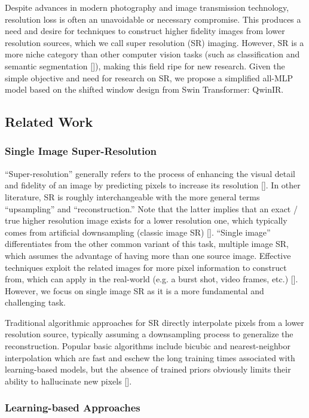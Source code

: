 \documentclass{article}
\begin{document}
Despite advances in modern photography and image transmission technology, resolution loss is often an unavoidable or necessary compromise. This produces a need and desire for techniques to construct higher fidelity images from lower resolution sources, which we call super resolution (SR) imaging. However, SR is a more niche category than other computer vision tasks (such as classification and semantic segmentation []), making this field ripe for new research. Given the simple objective and need for research on SR, we propose a simplified all-MLP model based on the shifted window design from Swin Transformer: QwinIR.

\subsection{Related Work}

\subsubsection{Single Image Super-Resolution}

“Super-resolution” generally refers to the process of enhancing the visual detail and fidelity of an image by predicting pixels to increase its resolution []. In other literature, SR is roughly interchangeable with the more general terms “upsampling” and “reconstruction.” Note that the latter implies that an exact / true higher resolution image exists for a lower resolution one, which typically comes from artificial downsampling (classic image SR) []. “Single image”  differentiates from the other common variant of this task, multiple image SR, which assumes the advantage of having more than one source image. Effective techniques exploit the related images for more pixel information to construct from, which can apply in the real-world (e.g. a burst shot, video frames, etc.) []. However, we focus on single image SR as it is a more fundamental and challenging task.

Traditional algorithmic approaches for SR directly interpolate pixels from a lower resolution source, typically assuming a downsampling process to generalize the reconstruction. Popular basic algorithms include bicubic and nearest-neighbor interpolation which are fast and eschew the long training times associated with learning-based models, but the absence of trained priors obviously limits their ability to hallucinate new pixels [].

\subsubsection{Learning-based Approaches}
\end{document}
